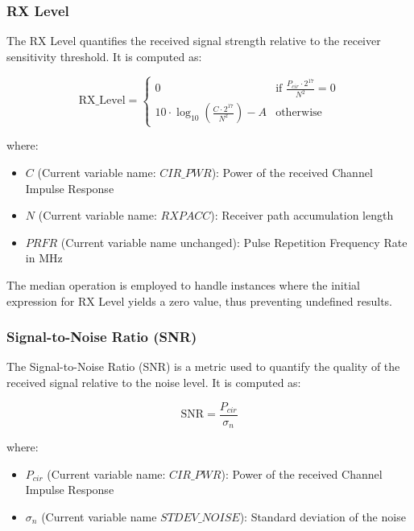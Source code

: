 \documentclass[
	article, %
	11pt, %
	draft, %
]{CSUniSchoolLabReport}
\begin{document}
\subsubsection{RX Level}\label{rx_level}

The RX Level quantifies the received signal strength relative to the receiver sensitivity threshold. It is computed as:

\begin{equation}
  \text{RX\_Level} =
  \begin{cases}
    0 & \text{if } \frac{P_{cir} \cdot 2^{17}}{N^2} = 0 \\
    10 \cdot \log_{10} \left( \frac{C \cdot 2^{17}}{N^2} \right) - A & \text{otherwise}
  \end{cases}
\end{equation}

where:

\begin{itemize}
  \item $C$ (Current variable name: $CIR\_PWR$): Power of the received Channel Impulse Response
  \item $N$ (Current variable name: $RXPACC$): Receiver path accumulation length
  \item $PRFR$ (Current variable name unchanged): Pulse Repetition Frequency Rate in MHz
\end{itemize}

The median operation is employed to handle instances where the initial expression for RX Level yields a zero value, thus preventing undefined results.

\subsubsection{Signal-to-Noise Ratio (SNR)}\label{snr}

The Signal-to-Noise Ratio (SNR) is a metric used to quantify the quality of the received signal relative to the noise level. It is computed as:

\begin{equation}
  \text{SNR} = \frac{P_{cir}}{\sigma_n}
\end{equation}

where:

\begin{itemize}
  \item $P_{cir}$ (Current variable name: $CIR\_PWR$): Power of the received Channel Impulse Response
  \item $\sigma_n$ (Current variable name $STDEV\_NOISE$): Standard deviation of the noise
\end{itemize}
\end{document}
